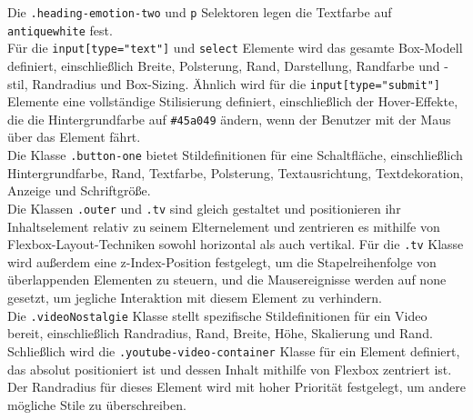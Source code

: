 \documentclass[./dokumentation.tex]{subfiles}
\begin{document}
Die \verb+.heading-emotion-two+ und \verb+p+ Selektoren legen die Textfarbe auf \verb+antiquewhite+ fest.\\
Für die \verb+input[type="text"]+ und \verb+select+ Elemente wird das gesamte Box-Modell definiert, einschließlich Breite, Polsterung, Rand, Darstellung, Randfarbe und -stil, Randradius und Box-Sizing. Ähnlich wird für die \verb+input[type="submit"]+ Elemente eine vollständige Stilisierung definiert, einschließlich der Hover-Effekte, die die Hintergrundfarbe auf \verb+#45a049+ ändern, wenn der Benutzer mit der Maus über das Element fährt.\\
Die Klasse \verb+.button-one+ bietet Stildefinitionen für eine Schaltfläche, einschließlich Hintergrundfarbe, Rand, Textfarbe, Polsterung, Textausrichtung, Textdekoration, Anzeige und Schriftgröße.\\
Die Klassen \verb+.outer+ und \verb+.tv+ sind gleich gestaltet und positionieren ihr Inhaltselement relativ zu seinem Elternelement und zentrieren es mithilfe von Flexbox-Layout-Techniken sowohl horizontal als auch vertikal. Für die \verb+.tv+ Klasse wird außerdem eine z-Index-Position festgelegt, um die Stapelreihenfolge von überlappenden Elementen zu steuern, und die Mausereignisse werden auf none gesetzt, um jegliche Interaktion mit diesem Element zu verhindern.\\
Die \verb+.videoNostalgie+ Klasse stellt spezifische Stildefinitionen für ein Video bereit, einschließlich Randradius, Rand, Breite, Höhe, Skalierung und Rand.\\
Schließlich wird die \verb+.youtube-video-container+ Klasse für ein Element definiert, das absolut positioniert ist und dessen Inhalt mithilfe von Flexbox zentriert ist. Der Randradius für dieses Element wird mit hoher Priorität festgelegt, um andere mögliche Stile zu überschreiben.
\end{document}
